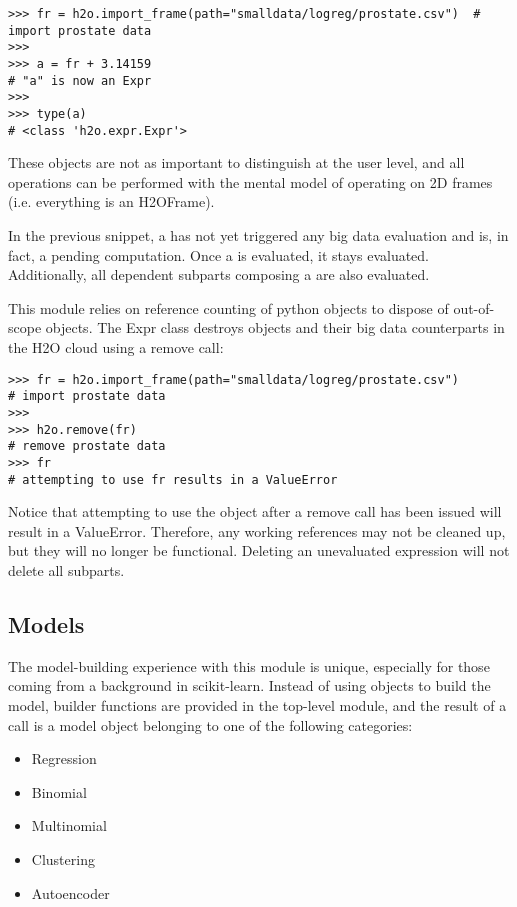 \begin{lstlisting}[style=python]
>>> fr = h2o.import_frame(path="smalldata/logreg/prostate.csv")  # import prostate data
>>>
>>> a = fr + 3.14159                         
# "a" is now an Expr
>>>
>>> type(a)                                        
# <class 'h2o.expr.Expr'>
\end{lstlisting}

These objects are not as important to distinguish at the user level, and all operations can be performed with the mental model of operating on 2D frames (i.e. everything is an H2OFrame).

In the previous snippet, a has not yet triggered any big data evaluation and is, in fact, a pending computation. Once a is evaluated, it stays evaluated. Additionally, all dependent subparts composing a are also evaluated.

This module relies on reference counting of python objects to dispose of out-of-scope objects. The Expr class destroys objects and their big data counterparts in the H2O cloud using a remove call:

\begin{lstlisting}[style=python]
>>> fr = h2o.import_frame(path="smalldata/logreg/prostate.csv")  
# import prostate data
>>>
>>> h2o.remove(fr)                                               
# remove prostate data
>>> fr                                                           
# attempting to use fr results in a ValueError
\end{lstlisting}

Notice that attempting to use the object after a remove call has been issued will result in a ValueError. Therefore, any working references may not be cleaned up, but they will no longer be functional. Deleting an unevaluated expression will not delete all subparts.

\subsection{Models}

The model-building experience with this module is unique, especially for those coming from a background in scikit-learn. Instead of using objects to build the model, builder functions are provided in the top-level module, and the result of a call is a model object belonging to one of the following categories:

\begin{itemize}
\item Regression
\item Binomial
\item Multinomial
\item Clustering
\item Autoencoder
\end{itemize}

